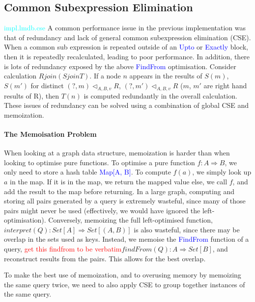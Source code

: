 \documentclass[12pt,a4paper,twoside,openright]{report}
\newcommand\todo[1]{\textcolor{red}{#1}}
\newcommand\codeName[1]{\textcolor{blue}{#1}}
\newcommand\note[1]{\textcolor{cyan}{#1}}
\newcommand{\opRule}[3]{#1 \triangleleft_{#2, v} #3}
\begin{document}
	\subsection{Common Subexpression Elimination}
	\note{impl.lmdb.cse}
	A common performance issue in the previous implementation was that of redundancy and lack of general common subexpression elimination (CSE). When a common sub expression is repeated outside of an \codeName{Upto} or \codeName{Exactly} block, then it is repeatedly recalculated, leading to poor performance. In addition, there is lots of redundancy exposed by the above \codeName{FindFrom} optimisation. Consider calculation $R join (S join T)$. If a node $n$ appears in the results of $S(m)$, $S(m')$ for distinct $\opRule{(?, m)}{A, B}{R}$, $\opRule{(?, m')}{A, B}{R}$ ($m$, $m'$ are right hand results of R), then $T(n)$ is computed redundantly in the overall calculation. These issues of redundancy can be solved using a combination of global CSE and memoization.

		\paragraph{The Memoisation Problem}
		When looking at a graph data structure, memoization is harder than when looking to optimise pure functions. To optimise a pure function $f\colon A \Rightarrow B$, we only need to store a hash table \codeName{Map[A, B]}. To compute $f(a)$, we simply look up $a$ in the map. If it is in the map, we return the mapped value else, we call $f$, and add the result to the map before returning. In a large graph, computing and storing all pairs generated by a query is extremely wasteful, since many of those pairs might never be used (effectively, we would have ignored the left-optimisation). Conversely, memoizing the full left-optimised function, $interpret(Q)\colon Set[A] \Rightarrow Set[(A, B)]$ is also wasteful, since there may be overlap in the sets used as keys. Instead, we memoise the \codeName{FindFrom} function of a query, \todo{get this findfrom to be verbatim}$findFrom(Q)\colon A \Rightarrow Set[B]$, and reconstruct results from the pairs. This allows for the best overlap.

To make the best use of memoization, and to overusing memory by memoizing the same query twice, we need to also apply CSE to group together instances of the same query.
\end{document}
